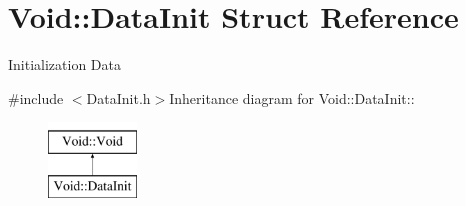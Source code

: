 \hypertarget{structVoid_1_1DataInit}{
\section{Void::DataInit Struct Reference}
\label{structVoid_1_1DataInit}
}


Initialization Data  


{\ttfamily \#include $<$DataInit.h$>$}Inheritance diagram for Void::DataInit::\begin{figure}[H]
\begin{center}
\leavevmode
\includegraphics[height=2cm]{structVoid_1_1DataInit}
\end{center}
\end{figure}

